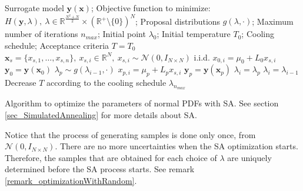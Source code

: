\begin{algorithm}%
\SetAlgoLined
   Surrogate model $\pmb{y}(\pmb{x})$; Objective function to minimize: $H(\pmb{y}, \lambda), \ \lambda\in\mathbb{R}^{\frac{N^2+N}{2}} \times (\mathbb{R}^+\setminus\{0\})^N$; Proposal distributions $g(\lambda,\cdot)$; Maximum number of iterations $n_{max}$; Initial point $\lambda_0$; Initial temperature $T_0$; Cooling schedule; Acceptance criteria\;
  $T = T_0$\;
  $\pmb{x}_s = \{x_{s,1},\dots,x_{s,n}\}, \ x_{s,i}\in \mathbb{R}^{N}, \ x_{s,i} \sim \mathcal{N}(0,I_{N\times N})$  i.i.d.\;
  {
    $x_{0,i} = \mu_0 + L_0x_{s,i}$\;
  }
  $\pmb{y}_0 = \pmb{y}(\pmb{x}_0)$\;
  {
    $\lambda_p \sim g(\lambda_{i-1},\cdot)$\;
    {
      $x_{p,i} = \mu_p + L_px_{s,i}$\;
    }
    $\pmb{y}_p = \pmb{y}(\pmb{x}_p)$\;
    {
      $\lambda_i = \lambda_p$\;
    }
    \Else
    {
      $\lambda_i = \lambda_{i-1}$\;
    }
    Decrease $T$ according to the cooling schedule\;
  }
   $\lambda_{n_{max}}$\;
\caption[Optimizing the parameters of normal PDFs with SA]
{
  Algorithm to optimize the parameters of normal PDFs with SA. See section \ref{sec_SimulatedAnnealing} for more details about SA.
}
\label{alg_multivariateNormalOptimizationWithSA}
\end{algorithm}

\begin{remark} \label{remark_SamplingOnceMultivariateNormal}
Notice that the process of generating samples is done only once, from $\mathcal{N}(0,I_{N\times N})$. 
There are no more uncertainties when the SA optimization starts.
Therefore, the samples that are obtained for each choice of $\lambda$ are uniquely determined before the SA process starts. See remark \ref{remark_optimizationWithRandom}.
\end{remark}

